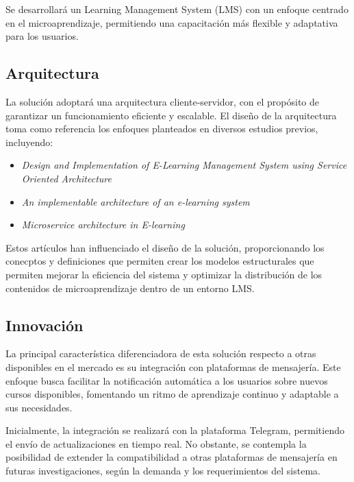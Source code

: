Se desarrollará un Learning Management System (LMS) con un enfoque
centrado en el microaprendizaje, permitiendo una capacitación más
flexible y adaptativa para los usuarios.  

\subsection{Arquitectura}  
La solución adoptará una arquitectura cliente-servidor, con el
propósito de garantizar un funcionamiento eficiente y escalable. El diseño de la
arquitectura toma como referencia los enfoques planteados en diversos estudios
previos, incluyendo:  

\begin{itemize}  
    \item \textit{Design and Implementation of E-Learning Management System
    using Service Oriented Architecture} \cite{article:design_lms_soa_jabr}  
    \item \textit{An implementable architecture of an e-learning system}
    \cite{inproceedings:elearning_architecture_liu}  
    \item \textit{Microservice architecture in E-learning}
    \cite{article:microservice_architecture_elearning_milovanovic}  
\end{itemize}  

Estos artículos han influenciado el diseño de la solución, proporcionando los
conecptos y definiciones que permiten crear los modelos estructurales que
permiten mejorar la eficiencia del sistema y optimizar la distribución de los
contenidos de microaprendizaje dentro de un entorno LMS.  

\subsection{Innovación}  
La principal característica diferenciadora de esta solución respecto a otras
disponibles en el mercado es su integración con plataformas de mensajería. Este
enfoque busca facilitar la notificación automática a los usuarios sobre nuevos
cursos disponibles, fomentando un ritmo de aprendizaje continuo y adaptable a
sus necesidades.  

Inicialmente, la integración se realizará con la plataforma Telegram,
permitiendo el envío de actualizaciones en tiempo real. No obstante, se
contempla la posibilidad de extender la compatibilidad a otras plataformas de
mensajería en futuras investigaciones, según la demanda y los requerimientos del
sistema.  

